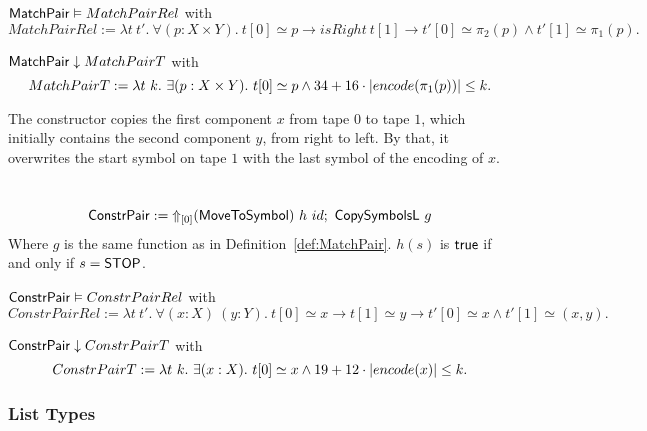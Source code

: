 \begin{lemma}
  \label{lem:MatchPair_Realise}
  $\MS{MatchPair} \Realise MatchPairRel$ with
  \small
  \[
    MatchPairRel := \lambda t~t'.~\forall (p: X \times Y).~t[0] \simeq p \rightarrow isRight~t[1] \rightarrow t'[0] \simeq \pi_2(p) \land t'[1] \simeq \pi_1(p).
  \]
\end{lemma}
\begin{lemma}
  \label{lem:MatchPair_TerminatesIn}
  $\MS{MatchPair} \TerminatesIn MatchPairT$ with
  \[
    MatchPairT := \lambda t~k.~\exists (p: X \times Y).~t[0] \simeq p \land 34 + 16 \cdot \size{\pi_1(p)} \leq k.
  \]
\end{lemma}

The constructor copies the first component $x$ from tape $0$ to tape $1$, which initially contains the second component $y$, from right to left.  By
that, it overwrites the start symbol on tape $1$ with the last symbol of the encoding of $x$.

\begin{definition}
  \label{def:Constr_pair}
  ~
  \[
    \MS{ConstrPair} := \LiftTapes{(\MS{MoveToSymbol})}{\Vector{0}}~h~id \Seq \MS{CopySymbolsL}~g
  \]
  Where $g$ is the same function as in Definition~\ref{def:MatchPair}.  $h(s)$ is $\true$ if and only if $s=\MS{STOP}$.
\end{definition}

\begin{lemma}
  \label{lem:Constr_pair_Realise}
  \small
  $\MS{ConstrPair} \Realise ConstrPairRel$ with
  \[
    ConstrPairRel := \lambda t~t'.~\forall (x:X)~(y:Y).~t[0] \simeq x \rightarrow t[1] \simeq y \rightarrow t'[0] \simeq x \land t'[1] \simeq (x,y).
  \]
\end{lemma}
\begin{lemma}
  \label{lem:Constr_pair_TerminatesIn}
  $\MS{ConstrPair} \TerminatesIn ConstrPairT$ with
  \[
    ConstrPairT := \lambda t~k.~\exists (x: X).~t[0] \simeq x \land 19 + 12 \cdot \size{x} \leq k.
  \]
\end{lemma}

\subsubsection{List Types}
\label{sec:MatchList}
%

